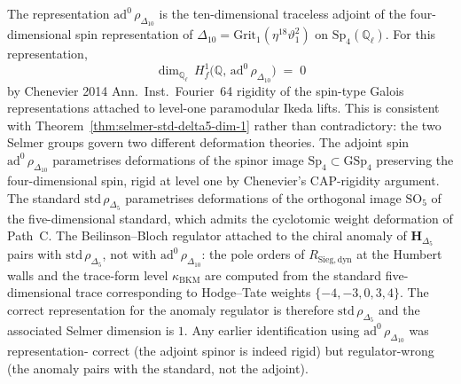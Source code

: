 \begin{corollary}
\label{cor:ad0-spin-rigidity-vs-std-tangent}
The representation $\mathrm{ad}^0\,\rho_{\Delta_{10}}$ is the ten-dimensional traceless
adjoint of the four-dimensional spin representation of
$\Delta_{10} = \mathrm{Grit}_1(\eta^{18}\vartheta_1^2)$ on
$\mathrm{Sp}_4(\mathbb{Q}_\ell)$. For this representation,
\[
 \dim_{\mathbb{Q}_\ell}\, H^1_f\!\bigl(\mathbb{Q},\,\mathrm{ad}^0\,\rho_{\Delta_{10}}\bigr)
 \;=\;
 0
\]
by Chenevier 2014 \textup{Ann.~Inst.\ Fourier}~64 rigidity of the spin-type Galois
representations attached to level-one paramodular Ikeda lifts. This is consistent
with Theorem~\ref{thm:selmer-std-delta5-dim-1} rather than contradictory: the two
Selmer groups govern two different deformation theories. The adjoint spin
$\mathrm{ad}^0\,\rho_{\Delta_{10}}$ parametrises deformations of the spinor image
$\mathrm{Sp}_4\subset\mathrm{GSp}_4$ preserving the four-dimensional spin, rigid at
level one by Chenevier's CAP-rigidity argument. The standard
$\mathrm{std}\,\rho_{\Delta_5}$ parametrises deformations of the orthogonal image
$\mathrm{SO}_5$ of the five-dimensional standard, which admits the cyclotomic weight
deformation of Path~C. The Beilinson--Bloch regulator attached to the chiral
anomaly of $\mathbf{H}_{\Delta_5}$ pairs with $\mathrm{std}\,\rho_{\Delta_5}$, not
with $\mathrm{ad}^0\,\rho_{\Delta_{10}}$: the pole orders of $R_{\mathrm{Sieg,dyn}}$ at
the Humbert walls and the trace-form level $\kappa_{\mathrm{BKM}}$ are computed from
the standard five-dimensional trace corresponding to Hodge--Tate weights
$\{-4,-3,0,3,4\}$. The correct representation for the anomaly regulator is therefore
$\mathrm{std}\,\rho_{\Delta_5}$ and the associated Selmer dimension is $1$. Any
earlier identification using $\mathrm{ad}^0\,\rho_{\Delta_{10}}$ was representation-
correct (the adjoint spinor is indeed rigid) but regulator-wrong (the anomaly pairs
with the standard, not the adjoint).
\end{corollary}

